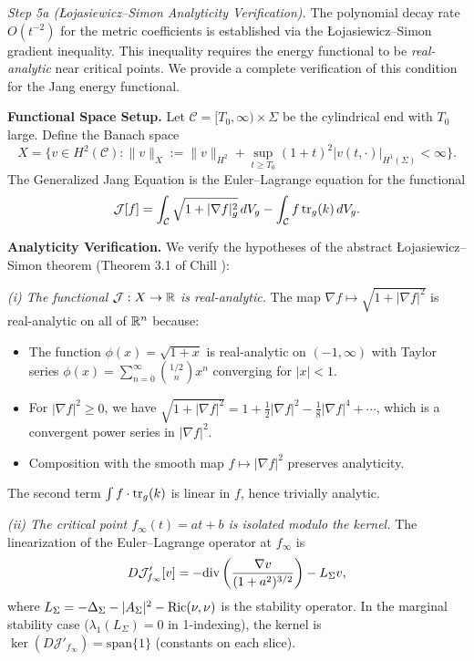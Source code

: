 \begin{lemma}
\textit{Step 5a (\L{}ojasiewicz--Simon Analyticity Verification).} The polynomial decay rate $O(t^{-2})$ for the metric coefficients is established via the \L{}ojasiewicz--Simon gradient inequality. This inequality requires the energy functional to be \emph{real-analytic} near critical points. We provide a complete verification of this condition for the Jang energy functional.

\textbf{Functional Space Setup.} Let $\mathcal{C} = [T_0, \infty) \times \Sigma$ be the cylindrical end with $T_0$ large. Define the Banach space
\[
    X = \{ v \in H^2(\mathcal{C}) : \|v\|_X := \|v\|_{H^2} + \sup_{t \ge T_0} (1+t)^2 |v(t,\cdot)|_{H^1(\Sigma)} < \infty \}.
\]
The Generalized Jang Equation is the Euler--Lagrange equation for the functional
\[
    \mathcal{J}[f] = \int_{\mathcal{C}} \sqrt{1 + |\nabla f|^2_g} \, dV_g - \int_{\mathcal{C}} f \, \mathrm{tr}_g(k) \, dV_g.
\]

\textbf{Analyticity Verification.} We verify the hypotheses of the abstract \L{}ojasiewicz--Simon theorem (Theorem 3.1 of Chill \cite{chill2003}):

\textit{(i) The functional $\mathcal{J}: X \to \mathbb{R}$ is real-analytic.} The map $\nabla f \mapsto \sqrt{1 + |\nabla f|^2}$ is real-analytic on all of $\mathbb{R}^n$ because:
\begin{itemize}
    \item The function $\phi(x) = \sqrt{1+x}$ is real-analytic on $(-1, \infty)$ with Taylor series $\phi(x) = \sum_{n=0}^\infty \binom{1/2}{n} x^n$ converging for $|x| < 1$.
    \item For $|\nabla f|^2 \ge 0$, we have $\sqrt{1 + |\nabla f|^2} = 1 + \frac{1}{2}|\nabla f|^2 - \frac{1}{8}|\nabla f|^4 + \cdots$, which is a convergent power series in $|\nabla f|^2$.
    \item Composition with the smooth map $f \mapsto |\nabla f|^2$ preserves analyticity.
\end{itemize}
The second term $\int f \cdot \mathrm{tr}_g(k)$ is linear in $f$, hence trivially analytic.

\textit{(ii) The critical point $f_\infty(t) = at + b$ is isolated modulo the kernel.} The linearization of the Euler--Lagrange operator at $f_\infty$ is
\[
    D\mathcal{J}'_{f_\infty}[v] = -\mathrm{div}\left( \frac{\nabla v}{(1+a^2)^{3/2}} \right) - L_\Sigma v,
\]
where $L_\Sigma = -\Delta_\Sigma - |A_\Sigma|^2 - \mathrm{Ric}(\nu,\nu)$ is the stability operator. In the marginal stability case ($\lambda_1(L_\Sigma) = 0$ in 1-indexing), the kernel is $\ker(D\mathcal{J}'_{f_\infty}) = \text{span}\{1\}$ (constants on each slice).


\end{lemma}
